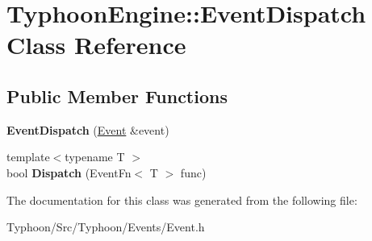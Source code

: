 \hypertarget{class_typhoon_engine_1_1_event_dispatch}{}\section{Typhoon\+Engine\+::Event\+Dispatch Class Reference}
\label{class_typhoon_engine_1_1_event_dispatch}
\subsection*{Public Member Functions}
\begin{DoxyCompactItemize}
\item 
\mbox{\label{class_typhoon_engine_1_1_event_dispatch_a341cda11d12eb7669632d962ab315275}} 
{\bfseries Event\+Dispatch} (\mbox{\hyperlink{class_typhoon_engine_1_1_event}{Event}} \&event)
\item 
\mbox{\label{class_typhoon_engine_1_1_event_dispatch_af78174f5fd63b1d8be0994ba2a804189}} 
{\footnotesize template$<$typename T $>$ }\\bool {\bfseries Dispatch} (Event\+Fn$<$ T $>$ func)
\end{DoxyCompactItemize}


The documentation for this class was generated from the following file\+:\begin{DoxyCompactItemize}
\item 
Typhoon/\+Src/\+Typhoon/\+Events/Event.\+h\end{DoxyCompactItemize}
